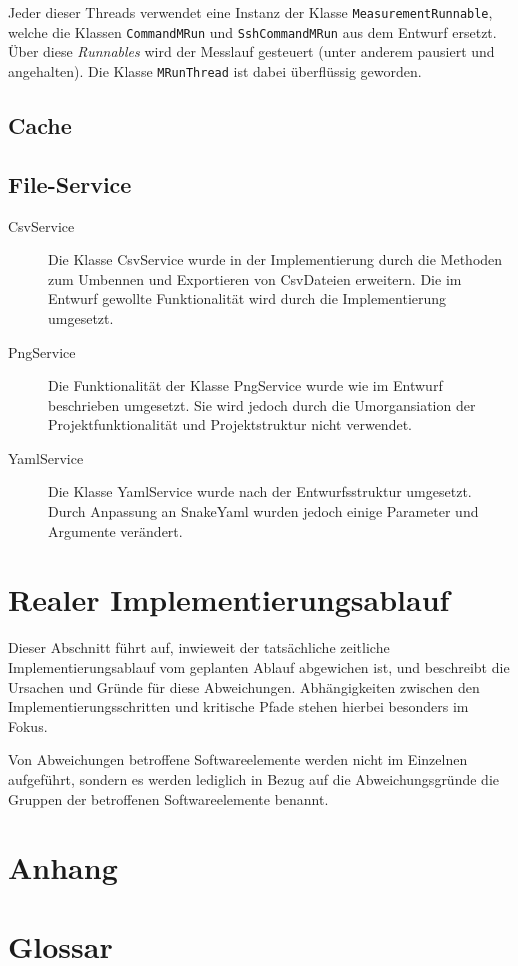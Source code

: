 \documentclass[parskip=full]{scrartcl}
\begin{document}
Jeder dieser Threads verwendet eine Instanz der Klasse \verb:MeasurementRunnable:, welche die Klassen \verb:CommandMRun: und \verb:SshCommandMRun: aus dem Entwurf ersetzt. Über diese \textit{Runnables} wird der Messlauf gesteuert (unter anderem pausiert und angehalten). Die Klasse \verb:MRunThread: ist dabei überflüssig geworden.

\subsection{Cache}

\subsection{File-Service}

\begin{description}
\item[CsvService] Die Klasse CsvService wurde in der Implementierung durch die Methoden zum Umbennen und Exportieren von CsvDateien erweitern. Die im Entwurf gewollte Funktionalität wird durch die Implementierung umgesetzt.
\item[PngService] Die Funktionalität der Klasse PngService wurde wie im Entwurf beschrieben umgesetzt. Sie wird jedoch durch die Umorgansiation der Projektfunktionalität und Projektstruktur nicht verwendet.
\item[YamlService] Die Klasse YamlService wurde nach der Entwurfsstruktur umgesetzt. Durch Anpassung an SnakeYaml wurden jedoch einige Parameter und Argumente verändert.

\end{description}

\section{Realer Implementierungsablauf}

Dieser Abschnitt führt auf, inwieweit der tatsächliche zeitliche Implementierungsablauf vom geplanten Ablauf abgewichen ist, und beschreibt die Ursachen und Gründe für diese Abweichungen. Abhängigkeiten zwischen den Implementierungsschritten und kritische Pfade stehen hierbei besonders im Fokus.

Von Abweichungen betroffene Softwareelemente werden nicht im Einzelnen aufgeführt, sondern es werden lediglich in Bezug auf die Abweichungsgründe die Gruppen der betroffenen Softwareelemente benannt.

\section{Anhang}



\clearpage
\section{Glossar}\label{glossar}

\renewcommand*{\glossarysection}[2][]{}	%
\printnoidxglossaries				%
\end{document}
